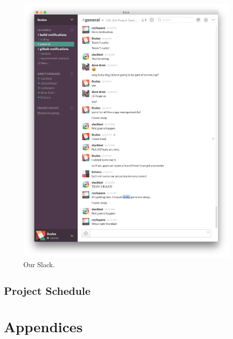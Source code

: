 \documentclass[12pt]{article}
\begin{document}
\begin{figure}[H]
        \centering
        \includegraphics[width=4.5in]{slack-window.png}
        \caption{Our Slack.}\label{slack:window}
\end{figure}


\subsection{Project Schedule} %
\section{Appendices}








\end{document}
